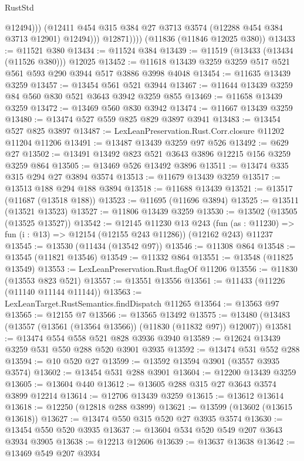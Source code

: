 \begin{lexlean}{RustStd}
\begin{coremodule}
                      @12494)))
                (@12411 @454 @315 @384 @27 @3713 @3574 (@12288 @454 @384 @3713 @12901) @12494)))
            @12871))))
    (@11836 (@11846 @12025 @380))
@13433 := @11521 @380
@13434 := @11524 @384
@13439 := @11519 (@13433 (@13434 (@11526 @380))) @12025
@13452 := @11618 @13439 @3259 @3259 @517 @521 @561 @593 @290 @3944 @517 @3886 @3998 @4048
@13454 := @11635 @13439 @3259
@13457 := @13454 @561 @521 @3944
@13467 := @11644 @13439 @3259 @84 @560 @830 @521 @3643 @3942 @3259 @855
@13469 := @11658 @13439 @3259
@13472 := @13469 @560 @830 @3942
@13474 := @11667 @13439 @3259
@13480 := @13474 @527 @559 @825 @829 @3897 @3941
@13483 := @13454 @527 @825 @3897
@13487 := LexLeanPreservation.Rust.Corr.closure @11202 @11204 @11206
@13491 := @13487 @13439 @3259 @97 @526
@13492 := @629 @27
@13502 := @13491 @13492 @823 @521 @3643 @3896 @12215 @156 @3259 @3259 @864
@13505 := @13469 @526 @13492 @3896
@13511 := @13474 @335 @315 @294 @27 @3894 @3574
@13513 := @11679 @13439 @3259
@13517 := @13513 @188 @294 @188 @3894
@13518 := @11688 @13439
@13521 := @13517 (@11687 (@13518 @188))
@13523 := @11695 (@11696 @3894)
@13525 := @13511 (@13521 @13523)
@13527 := @11806 @13439 @3259
@13530 := @13502 (@13505 (@13525 @13527))
@13542 := @12145
    @11230
    @13
    @243
    (fun (as : @11230) => fun (i : @13) => @12154 (@12155 @243 @11286))
    (@12162 @243)
    @11237
@13545 := @13530 (@11434 (@13542 @97))
@13546 := @11308 @864
@13548 := @13545 (@11821 @13546)
@13549 := @11332 @864
@13551 := @13548 (@11825 @13549)
@13553 := LexLeanPreservation.Rust.flagOf @11206
@13556 := @11830 (@13553 @823 @521)
@13557 := @13551 @13556
@13561 := @11433 (@11226 (@11140 @11144 @11144))
@13563 := LexLeanTarget.RustSemantics.findDispatch @11265
@13564 := @13563 @97
@13565 := @12155 @7
@13566 := @13565 @13492
@13575 := @13480 (@13483 (@13557 (@13561 (@13564 @13566)) (@11830 (@11832 @97)) @12007))
@13581 := @13474 @554 @558 @521 @828 @3936 @3940
@13589 := @12624 @13439 @3259 @531 @550 @288 @520 @3901 @3935
@13592 := @13474 @531 @552 @288
@13594 := @10 @520 @27
@13599 := @13592 @13594 @3901 (@3557 @3935 @3574)
@13602 := @13454 @531 @288 @3901
@13604 := @12200 @13439 @3259
@13605 := @13604 @440
@13612 := @13605 @288 @315 @27 @3643 @3574 @3899 @12214
@13614 := @12706 @13439 @3259
@13615 := @13612 @13614
@13618 := @12250 (@12818 @288 @3899)
@13621 := @13599 (@13602 (@13615 @13618))
@13627 := @13474 @550 @315 @520 @27 @3935 @3574
@13630 := @13454 @550 @520 @3935
@13637 := @13604 @534 @520 @549 @207 @3643 @3934 @3905
@13638 := @12213 @12606
@13639 := @13637 @13638
@13642 := @13469 @549 @207 @3934

\end{coremodule}
\end{lexlean}
